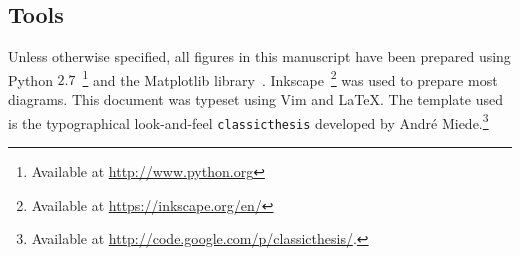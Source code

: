 \subsection{Tools}
\label{sub:tools}

Unless otherwise specified, all figures in this manuscript have been prepared
using Python $2.7$~\footnote{Available at \url{http://www.python.org}} and the
Matplotlib library~\cite{Hunter:2007}. Inkscape~\footnote{Available at
\url{https://inkscape.org/en/}} was used to prepare most diagrams. This document
was typeset using Vim and \LaTeX. The template used is the typographical look-and-feel
\texttt{classicthesis} developed by Andr\'e
Miede.\footnote{Available at 
\url{http://code.google.com/p/classicthesis/}.}

\begin{center}
\end{center}
